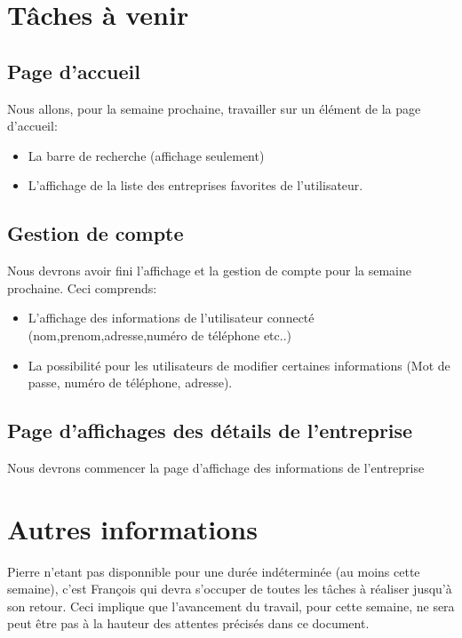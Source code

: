 \documentclass[a4paper]{article}
\begin{document}
\section{Tâches à venir}
\subsection{Page d'accueil}
Nous allons, pour la semaine prochaine, travailler sur un élément de la page d'accueil:
\begin{itemize}
  \item La barre de recherche (affichage seulement)
  \item L'affichage de la liste des entreprises favorites de l'utilisateur.
\end{itemize}

\subsection{Gestion de compte}
Nous devrons avoir fini l'affichage et la gestion de compte pour la semaine prochaine. Ceci comprends:
\begin{itemize}
  \item L'affichage des informations de l'utilisateur connecté (nom,prenom,adresse,numéro de téléphone etc..)
  \item La possibilité pour les utilisateurs de modifier certaines informations (Mot de passe, numéro de téléphone, adresse).
\end{itemize}

\subsection{Page d'affichages des détails de l'entreprise}
Nous devrons commencer la page d'affichage des informations de l'entreprise


\section{Autres informations}
Pierre n'etant pas disponnible pour une durée indéterminée (au moins cette semaine), c'est François qui devra s'occuper de toutes les tâches à réaliser jusqu'à son retour. Ceci implique que l'avancement du travail, pour cette semaine, ne sera peut être pas à la hauteur des attentes précisés dans ce document.
\end{document}
